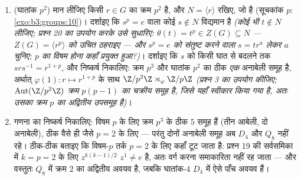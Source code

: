 \begin{problem}
\begin{enumerate}[resume]
        त्रिभुजाकार $N$ के साथ $(I + N)^p$ परिकलित कीजिए): क्रम
        $p^3$ का प्रत्येक घातांक-$p$ अनाबेली समूह $H_p$ के
        तुल्याकारी है।
  \item (घातांक $p^2$) मान लीजिए किसी $r \in G$ का क्रम $p^2$ है,
        और $N = \langle r\rangle$ रखिए, जो  है (सूचकांक $p$:
        \cref{exo:b3:groups:10})। दर्शाइए कि $s^p = e$ वाला कोई $s \notin N$ विद्यमान है
        \emph{(कोई भी $t \notin N$ लीजिए; प्रश्न 20 का उपयोग करके उसे
        सुधारिए: $\theta(t) = t^p \in Z(G) \subseteq N$ --- $Z(G) = \langle r^p\rangle$ को उचित ठहराइए --- और $s^p = e$
        को संतुष्ट करने वाला $s = tr^{a}$ लेकर $a$ चुनिए; $p$ का
        विषम होना कहाँ प्रयुक्त हुआ?)}। दर्शाइए कि $s$ को
        किसी घात से बदलने तक $srs^{-1} = r^{1+p}$, और निष्कर्ष निकालिए: क्रम
        $p^3$ और घातांक $p^2$ का ठीक \emph{एक} अनाबेली समूह
        है, अर्थात् $\varphi(1)\colon r \mapsto r^{1+p}$ के साथ $\Z/p^2\Z \rtimes_\varphi \Z/p\Z$ \emph{(प्रश्न 3 का
        उपयोग कीजिए; $\operatorname{Aut}(\Z/p^2\Z)$ क्रम $p(p-1)$ का चक्रीय समूह है, जिसे
        यहाँ स्वीकार किया गया है, अतः उसका क्रम $p$ का
        अद्वितीय उपसमूह है)}।
  \item गणना का निष्कर्ष निकालिए: विषम $p$ के लिए क्रम $p^3$
        के ठीक $5$ समूह हैं (तीन आबेली, दो अनाबेली), ठीक वैसे
        ही जैसे $p = 2$ के लिए --- परंतु दोनों अनाबेली समूह अब
        $D_4$ और $Q_8$ नहीं रहे। ठीक-ठीक बताइए कि विषम-$p$
        तर्क $p = 2$ के लिए कहाँ टूट जाता है: प्रश्न 19 की
        सर्वसमिका में $k = p = 2$ के लिए $z^{k(k-1)/2}$ $z^1 \neq
        e$ है, अतः वर्ग
        करना समाकारिता नहीं रह जाता --- और वस्तुतः $Q_8$ में
        क्रम $2$ का अद्वितीय अवयव है, जबकि घातांक-$4$
        $D_4$ में ऐसे पाँच अवयव हैं।
\end{enumerate}


\end{problem}
